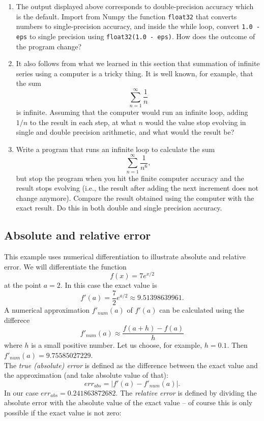 \documentclass{article}
\begin{document}
\begin{enumerate}
\item The output displayed above corresponds to double-precision 
accuracy which is the default. Import from Numpy the function {\tt float32}
that converts numbers to single-precision accuracy, and inside the while loop,
convert {\tt 1.0 - eps} to single precision using {\tt float32(1.0 - eps)}.
How does the outcome of the program change?
\item It also follows from what we learned in this section that summation 
of infinite series using a computer is a tricky thing. It is well known,
for example, that the sum
$$
\sum_{n=1}^{\infty} \frac{1}{n}
$$
is infinite. Assuming that the computer would run an infinite loop, adding 
$1/n$ to the result in each step, at what $n$ would the value stop evolving 
in single and double precision arithmetic, and what would the result be?
\item Write a program that runs an infinite loop to calculate the sum
$$
\sum_{n=1}^{\infty} \frac{1}{n^6},
$$
but stop the program when you hit the finite computer accuracy and the result 
stops evolving (i.e., the result after adding the next increment does not 
change anymore). Compare the result 
obtained using the computer with the exact result. Do this in both double 
and single precision accuracy.
\end{enumerate}

\subsection{Absolute and relative error}

This example uses numerical differentiation to illustrate
absolute and relative error. We will differentiate the 
function 
$$
f(x) = 7e^{x/2}
$$
at the point $a = 2$. In this case the exact value is 
$$
f'(a) = \frac{7}{2}e^{a/2} \approx 9.51398639961.
$$
A numerical approximation $f'_{num}(a)$ of $f'(a)$ can be calculated using the differece
$$
f'_{num}(a) \approx \frac{f(a+h) - f(a)}{h}
$$
where $h$ is a small positive number. Let us choose, for example,
$h = 0.1$. Then $f'_{num}(a) = 9.75585027229$.\\

\noindent
The {\em true (absolute) error} is defined as the difference between the exact value and the approximation
(and take absolute value of that):
$$
err_{abs} = |f'(a) - f'_{num}(a)|.
$$
In our case $err_{abs} = 0.241863872682$. The {\em relative error} is defined by dividing 
the absolute error with the absolute value of the exact value -- of course this is only 
possible if the exact value is not zero:
\end{document}
